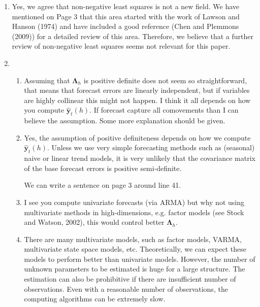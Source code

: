 \documentclass[10pt,a4paper]{article}
\begin{document}
\begin{enumerate}
\item [] {\color{blue} Yes, we agree that non-negative least squares is not a new field. We have mentioned on Page 3 that this area started with the work of Lawson and Hanson (1974) and have included a good reference (Chen and Plemmons (2009)) for a detailed review of this area. Therefore, we believe that a further review of non-negative least squares seems not relevant for this paper.}
\item \begin{enumerate}
	\item Assuming that $\bm{\Lambda}_h$ is positive definite does not seem so straightforward, that means that forecast errors are linearly independent, but if variables are highly collinear this might not happen. I think it all depends on how you compute $\hat{\bm{y}}_t(h)$. If forecast capture all comovements than I can believe the assumption. Some more explanation should be given.
	\item [] {\color{blue} Yes, the assumption of positive definiteness depends on how we compute $\hat{\bm{y}}_t(h)$. Unless we use very simple forecasting methods such as (seasonal) naive or linear trend models, it is very unlikely that the covariance matrix of the base forecast errors is positive semi-definite.}

	{\color{red} We can write a sentence on page 3 around line 41.}
	\item I see you compute univariate forecasts (via ARMA) but why not using multivariate methods in high-dimensions, e.g. factor models (see Stock and Watson, 2002), this would control better $\bm{\Lambda}_h$.

	\item [] {\color{blue} There are many multivariate models, such as factor models, VARMA, multivariate state space models, etc. Theoretically, we can expect these models to perform better than univariate models. However, the number of unknown parameters to be estimated is huge for a large structure. The estimation can also be prohibitive if there are insufficient number of observations. Even with a reasonable number of observations, the computing algorithms can be extremely slow.\\

}
\end{enumerate}
\end{enumerate}
\end{document}
